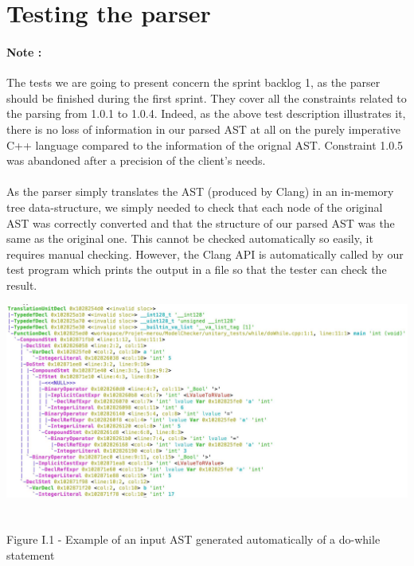\documentclass{report}
\begin{document}
\section{Testing the parser}

\paragraph{Note :}
The tests we are going to present concern the sprint backlog 1, as the parser should be finished during the first sprint.
They cover all the constraints related to the parsing from 1.0.1 to 1.0.4. Indeed, as the above test description illustrates it, there is no loss
of information in our parsed AST at all on the purely imperative C++ language compared to the information of the orignal AST. Constraint 1.0.5 was abandoned after a precision of the client's needs.

\paragraph{}
\hspace{4mm}As the parser simply translates the AST (produced by Clang) in an in-memory tree data-structure, we simply needed to check that
each node of the original AST was correctly converted and that the structure of our parsed AST was the same as the original one.
This cannot be checked automatically so easily, it requires manual checking. However, the Clang API is automatically called by our test
program which prints the output in a file so that the tester can check the result.

\begin{center}
\includegraphics[scale=0.3]{data/dowhile_clang.jpg}
~\\~\\Figure I.1 - Example of an input AST generated automatically of a do-while statement
\end{center}
\end{document}
